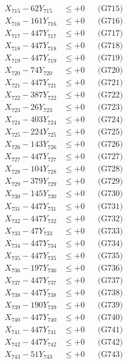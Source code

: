 \documentclass[a4paper,10pt]{article}
\begin{document}
{\begin{align}
X_{715} - 62Y_{715} &\leq +0 && \text{(G715)} \\
X_{716} - 161Y_{716} &\leq +0 && \text{(G716)} \\
X_{717} - 447Y_{717} &\leq +0 && \text{(G717)} \\
X_{718} - 447Y_{718} &\leq +0 && \text{(G718)} \\
X_{719} - 447Y_{719} &\leq +0 && \text{(G719)} \\
X_{720} - 74Y_{720} &\leq +0 && \text{(G720)} \\
\allowbreak
X_{721} - 447Y_{721} &\leq +0 && \text{(G721)} \\
X_{722} - 387Y_{722} &\leq +0 && \text{(G722)} \\
X_{723} - 26Y_{723} &\leq +0 && \text{(G723)} \\
X_{724} - 403Y_{724} &\leq +0 && \text{(G724)} \\
X_{725} - 224Y_{725} &\leq +0 && \text{(G725)} \\
X_{726} - 143Y_{726} &\leq +0 && \text{(G726)} \\
X_{727} - 447Y_{727} &\leq +0 && \text{(G727)} \\
X_{728} - 104Y_{728} &\leq +0 && \text{(G728)} \\
X_{729} - 379Y_{729} &\leq +0 && \text{(G729)} \\
X_{730} - 145Y_{730} &\leq +0 && \text{(G730)} \\
\allowbreak
X_{731} - 447Y_{731} &\leq +0 && \text{(G731)} \\
X_{732} - 447Y_{732} &\leq +0 && \text{(G732)} \\
X_{733} - 47Y_{733} &\leq +0 && \text{(G733)} \\
X_{734} - 447Y_{734} &\leq +0 && \text{(G734)} \\
X_{735} - 447Y_{735} &\leq +0 && \text{(G735)} \\
X_{736} - 197Y_{736} &\leq +0 && \text{(G736)} \\
X_{737} - 447Y_{737} &\leq +0 && \text{(G737)} \\
X_{738} - 447Y_{738} &\leq +0 && \text{(G738)} \\
X_{739} - 190Y_{739} &\leq +0 && \text{(G739)} \\
X_{740} - 447Y_{740} &\leq +0 && \text{(G740)} \\
\allowbreak
X_{741} - 447Y_{741} &\leq +0 && \text{(G741)} \\
X_{742} - 447Y_{742} &\leq +0 && \text{(G742)} \\
X_{743} - 51Y_{743} &\leq +0 && \text{(G743)} \\

\end{align}}
\end{document}
